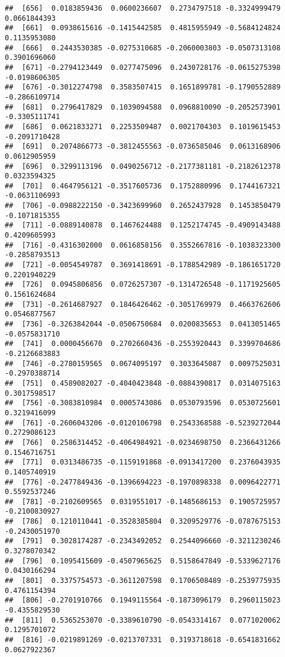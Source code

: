\documentclass[
]{article}
\begin{document}
\begin{verbatim}
##  [656]  0.0183859436  0.0600236607  0.2734797518 -0.3324999479  0.0661844393
##  [661]  0.0938615616 -0.1415442585  0.4815955949 -0.5684124824  0.1135953080
##  [666]  0.2443530385 -0.0275310685 -0.2060003803 -0.0507313108  0.3901696060
##  [671] -0.2794123449  0.0277475096  0.2430728176 -0.0615275398 -0.0198606305
##  [676] -0.3012274798  0.3583507415  0.1651899781 -0.1790552889 -0.2866109714
##  [681]  0.2796417829  0.1039094588  0.0968810090 -0.2052573901 -0.3305111741
##  [686]  0.0621833271  0.2253509487  0.0021704303  0.1019615453 -0.2091710428
##  [691]  0.2074866773 -0.3812455563 -0.0736585046  0.0613168906  0.0612905959
##  [696]  0.3299113196  0.0490256712 -0.2177381181 -0.2182612378  0.0323594325
##  [701]  0.4647956121 -0.3517605736  0.1752880996  0.1744167321 -0.0631106993
##  [706] -0.0988222150 -0.3423699960  0.2652437928  0.1453850479 -0.1071815355
##  [711] -0.0889140878  0.1467624488  0.1252174745 -0.4909143488  0.4209605993
##  [716] -0.4316302000  0.0616858156  0.3552667816 -0.1038323300 -0.2858793513
##  [721] -0.0054549787  0.3691418691 -0.1788542989 -0.1861651720  0.2201940229
##  [726]  0.0945806856  0.0726257307 -0.1314726548 -0.1171925605  0.1561624684
##  [731] -0.2614687927  0.1846426462 -0.3051769979  0.4663762606  0.0546877567
##  [736] -0.3263842044 -0.0506750684  0.0200835653  0.0413051465 -0.0575831710
##  [741]  0.0000456670  0.2702660436 -0.2553920443  0.3399704686 -0.2126683883
##  [746] -0.2780159565  0.0674095197  0.3033645087  0.0097525031 -0.2970388714
##  [751]  0.4589082027 -0.4040423848 -0.0884390817  0.0314075163  0.3017598517
##  [756] -0.3083810984  0.0005743086  0.0530793596  0.0530725601  0.3219416099
##  [761] -0.2606043206 -0.0120106798  0.2543368588 -0.5239272044  0.2729086123
##  [766]  0.2586314452 -0.4064984921 -0.0234698750  0.2366431266  0.1546716751
##  [771]  0.0313486735 -0.1159191868 -0.0913417200  0.2376043935  0.1405740919
##  [776] -0.2477849436 -0.1396694223 -0.1970898338  0.0096422771  0.5592537246
##  [781] -0.2102609565  0.0319551017 -0.1485686153  0.1905725957 -0.2100830927
##  [786]  0.1210110441 -0.3528385804  0.3209529776 -0.0787675153 -0.2430051970
##  [791]  0.3028174287 -0.2343492052  0.2544096660 -0.3211230246  0.3278070342
##  [796]  0.1095415609 -0.4507965625  0.5158647849 -0.5339627176  0.0430166294
##  [801]  0.3375754573 -0.3611207598  0.1706508489 -0.2539775935  0.4761154394
##  [806] -0.2701910766  0.1949115564 -0.1873096179  0.2960115023 -0.4355829530
##  [811]  0.5365253070 -0.3389610790 -0.0543314167  0.0771020062  0.1295701072
##  [816] -0.0219891269 -0.0213707331  0.3193718618 -0.6541831662  0.0627922367

\end{verbatim}
\end{document}
